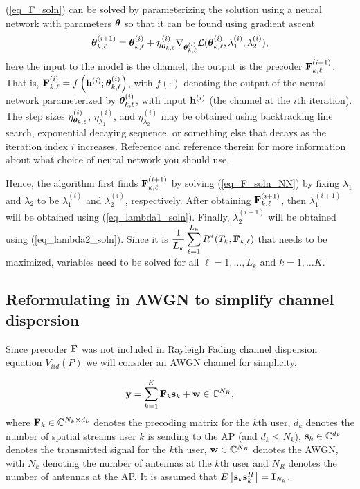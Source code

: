 \documentclass[a4paper, 12pt, onecolumn, journal, twoside, draftclsnofoot]{IEEEtran}
\begin{document}
(\ref{eq_F_soln}) can be solved by parameterizing the solution using a neural network with parameters ${\boldsymbol \theta}$ so that it can be found using gradient ascent
\begin{equation}
	{\boldsymbol \theta}_{k, \ell}^{(i+1)} = {\boldsymbol \theta}_{k, \ell}^{(i)} + \eta_{{\boldsymbol \theta}_{k,\ell}}^{(i)} \nabla_{{\boldsymbol \theta}_{k,\ell}^{(i)}}  { \mathcal{L} } ({\boldsymbol \theta}_{k,\ell}^{(i)}, \lambda_1^{(i)}, \lambda_2^{(i)}),
\label{eq_F_soln_NN}
\end{equation}
here the input to the model is the channel, the output is the precoder ${\bf F}_{k,\ell}^{(i+1)}$.  That is,  ${\bf F}_{k,\ell}^{(i)} = f\left( {\bf h}^{(i)}; {\boldsymbol \theta}_{k,\ell}^{(i)} \right)$, with $f(\cdot)$ denoting the output of the neural network parameterized by ${\boldsymbol \theta}_{k,\ell}^{(i)}$, with input ${\bf h}^{(i)}$ (the channel at the $i$th iteration).  The step sizes $\eta_{{\boldsymbol \theta}_{k,\ell}}^{(i)}$, $\eta_{\lambda_1}^{(i)}$, and $\eta_{\lambda_2}^{(i)}$ may be obtained using backtracking line search, exponential decaying sequence, or something else that decays as the iteration index $i$ increases.  Reference \cite{shi2021} and reference therein for more information about what choice of neural network you should use.

Hence, the algorithm first finds ${\bf F}_{k,\ell}^{(i+1)}$ by solving (\ref{eq_F_soln_NN}) by fixing $\lambda_1$ and $\lambda_2$ to be $\lambda_1^{(i)}$ and $\lambda_2^{(i)}$, respectively.  After obtaining ${\bf F}_{k,\ell}^{(i+1)}$, then $\lambda_1^{(i+1)}$ will be obtained using (\ref{eq_lambda1_soln}).  Finally, $\lambda_2^{(i+1)}$ will be obtained using (\ref{eq_lambda2_soln}).  Since it is $\displaystyle \frac{1}{L_k} \sum_{\ell=1}^{L_k} 		R^*(T_{k}, {\bf F}_{k, \ell})$ that needs to be maximized, variables need to be solved for all $\ell = 1, \ldots, L_k$ and $k = 1, \ldots K$.  



\subsection{Reformulating in AWGN to simplify channel dispersion}

Since precoder ${\bf F}$ was not included in Rayleigh Fading channel dispersion equation $V_{iid}(P)$ we will consider an AWGN channel for simplicity.

\begin{equation*}
	{\bf y} = \sum_{k=1}^K {\bf F}_k {\bf s}_k + {\bf w} \in \mathbb{C}^{N_R},
\end{equation*}
where 
${\bf F}_k \in \mathbb{C}^{N_k \times d_k}$ denotes the precoding matrix for the $k$th user, $d_k$ denotes the number of spatial streams user $k$ is sending to the AP (and $d_k \leq N_k$), ${\bf s}_k \in \mathbb{C}^{d_k}$ denotes the transmitted signal for the $k$th user, ${\bf w} \in \mathbb{C}^{N_R}$  denotes the AWGN, with $N_k$ denoting the number of antennas at the $k$th user and $N_R$ denotes the number of antennas at the AP.  It is assumed that $E \left[ {\bf s}_k {\bf s}_k^H \right] = {\bf I}_{N_k}$.
\end{document}
